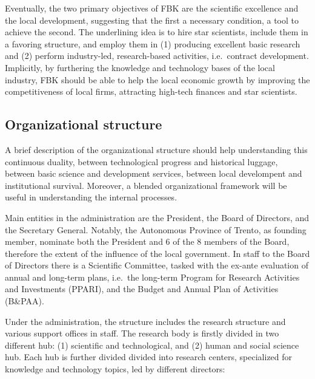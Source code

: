 Eventually, the two primary objectives of FBK are the scientific excellence and the local development, suggesting that the first a necessary condition, a tool to achieve the second. The underlining idea is to hire star scientists, include them in a favoring structure, and employ them in (1) producing excellent basic research and (2) perform industry-led, research-based activities, i.e.\ contract development. Implicitly, by furthering the knowledge and technology bases of the local industry, FBK should be able to help the local economic growth by improving the competitiveness of local firms, attracting high-tech finances and star scientists.

\subsection{Organizational structure}

A brief description of the organizational structure should help understanding this continuous duality, between technological progress and historical luggage, between basic science and development services, between local develompent and institutional survival. Moreover, a blended organizational framework will be useful in understanding the internal processes. 

Main entities in the administration are the President, the Board of Directors, and the Secretary General. Notably, the Autonomous Province of Trento, as founding member, nominate both the President and 6 of the 8 members of the Board, therefore the extent of the influence of the local government. In staff to the Board of Directors there is a Scientific Committee, tasked with the ex-ante evaluation of annual and long-term plans, i.e.\ the long-term Program for Research Activities and Investments (PPARI), and the Budget and Annual Plan of Activities (B\&PAA).

Under the administration, the structure includes the research structure and various support offices in staff. The research body is firstly divided in two different hub: (1) scientific and technological, and (2) human and social science hub. Each hub is further divided divided into research centers, specialized for knowledge and technology topics, led by different directors:

